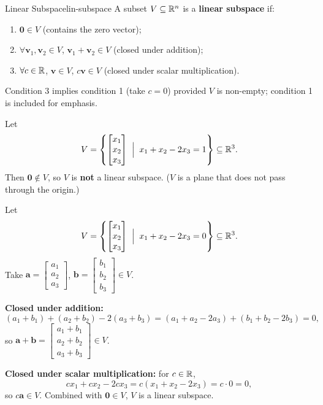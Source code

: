 \begin{definition}{Linear Subspace}{lin-subspace}
  A subset $V \subseteq \mathbb{R}^n$ is a \textbf{linear subspace} if:
  \begin{enumerate}
    \item $\mathbf{0} \in V$ (contains the zero vector);
    \item $\forall \mathbf{v}_1, \mathbf{v}_2 \in V$, $\mathbf{v}_1 + \mathbf{v}_2 \in V$ (closed under addition);
    \item $\forall c \in \mathbb{R}$, $\mathbf{v} \in V$, $c\mathbf{v} \in V$ (closed under scalar multiplication).
  \end{enumerate}
\end{definition}

\begin{remark}
  Condition 3 implies condition 1 (take $c = 0$) provided $V$ is non-empty; condition 1 is included for emphasis.
\end{remark}

\begin{example}
  Let
  \[
    V = \left\{
    \begin{bmatrix}
      x_1 \\ x_2 \\ x_3
    \end{bmatrix}
    \;\Bigm|\; x_1 + x_2 - 2x_3 = 1 \right\} \subseteq \mathbb{R}^3.
  \]
  Then $\mathbf{0} \notin V$, so $V$ is \textbf{not} a linear subspace. ($V$ is a plane that does not pass through the origin.)
\end{example}

\begin{example}
  Let
  \[
    V = \left\{
    \begin{bmatrix}
      x_1 \\ x_2 \\ x_3
    \end{bmatrix}
    \;\Bigm|\; x_1 + x_2 - 2x_3 = 0 \right\} \subseteq \mathbb{R}^3.
  \]
  Take $\mathbf{a} =
    \begin{bmatrix}
      a_1 \\ a_2 \\ a_3
    \end{bmatrix}
  $, $\mathbf{b} =
    \begin{bmatrix}
      b_1 \\ b_2 \\ b_3
    \end{bmatrix}
    \in V$.

  \textbf{Closed under addition:}
  \[
    (a_1 + b_1) + (a_2 + b_2) - 2(a_3 + b_3) = (a_1 + a_2 - 2a_3) + (b_1 + b_2 - 2b_3) = 0,
  \]
  so $\mathbf{a} + \mathbf{b} =
    \begin{bmatrix}
      a_1 + b_1 \\ a_2 + b_2 \\ a_3 + b_3
    \end{bmatrix}
    \in V$.

  \textbf{Closed under scalar multiplication:} for $c \in \mathbb{R}$,
  \[
    c x_1 + c x_2 - 2 c x_3 = c(x_1 + x_2 - 2 x_3) = c \cdot 0 = 0,
  \]
  so $c\mathbf{a} \in V$. Combined with $\mathbf{0} \in V$, $V$ is a linear subspace.
\end{example}

